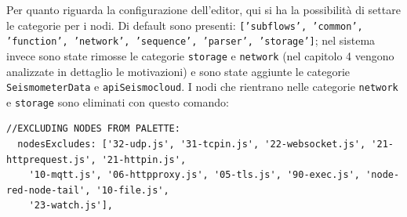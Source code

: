 \documentclass[a4paper,10pt]{memoir}
\begin{document}
Per quanto riguarda la configurazione dell'editor, qui si ha la possibilità di settare le categorie per i nodi. Di default sono presenti: \texttt{['subflows', 'common', 'function', 'network', 'sequence', 'parser', 'storage']}; nel sistema invece sono state rimosse le categorie \texttt{storage} e \texttt{network} (nel capitolo 4 vengono analizzate in dettaglio le motivazioni) e sono state aggiunte le categorie \texttt{SeismometerData} e \texttt{apiSeismocloud}.
I nodi che rientrano nelle categorie \texttt{network} e \texttt{storage} sono eliminati con questo comando:
\begin{lstlisting}
//EXCLUDING NODES FROM PALETTE:
  nodesExcludes: ['32-udp.js', '31-tcpin.js', '22-websocket.js', '21-httprequest.js', '21-httpin.js',
    '10-mqtt.js', '06-httpproxy.js', '05-tls.js', '90-exec.js', 'node-red-node-tail', '10-file.js',
    '23-watch.js'],
\end{lstlisting}
\end{document}
